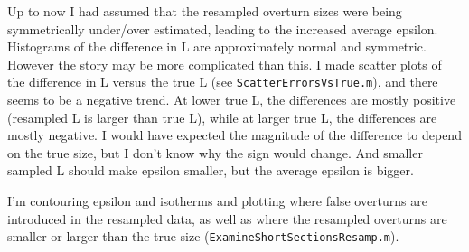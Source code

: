 \documentclass[11pt]{article}
\begin{document}
Up to now I had assumed that the resampled overturn sizes were being symmetrically under/over estimated, leading to the increased average epsilon. Histograms of the difference in L are approximately normal and symmetric. However the story may be more complicated than this. I made scatter plots of the difference in L versus the true L (see \verb+ScatterErrorsVsTrue.m+), and there seems to be a negative trend. At lower true L, the differences are mostly positive (resampled L is larger than true L), while at larger true L, the differences are mostly negative. I would have expected the magnitude of the difference to depend on the true size, but I don't know why the sign would change. And smaller sampled L should make epsilon smaller, but the average epsilon is bigger.


I'm contouring epsilon and isotherms and plotting where false overturns are introduced in the resampled data, as well as where the resampled overturns are smaller or larger than the true size (\verb+ExamineShortSectionsResamp.m+). 






%
%
\end{document}

